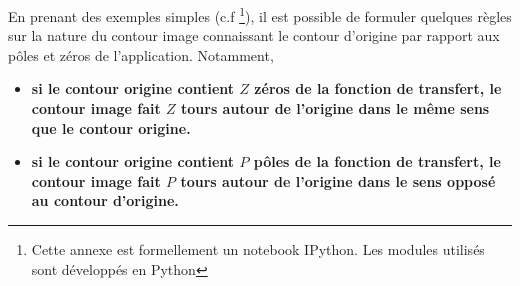 En prenant des exemples simples (c.f \footnote{Cette 
annexe est formellement un notebook IPython. Les modules utilisés sont 
développés en Python}), il est possible de formuler quelques règles sur la 
nature du contour image connaissant le contour d'origine par rapport aux
pôles et zéros de l'application. Notamment,
\begin{itemize}
    \item \textbf{si le contour origine contient $Z$ zéros de la fonction de 
          transfert, le contour image fait $Z$ tours autour de l'origine dans 
          le même sens que le contour origine.}
    \item \textbf{si le contour origine contient $P$ pôles de la fonction de 
          transfert, le contour image fait $P$ tours autour de l'origine dans 
          le sens opposé au contour d'origine.}
\end{itemize}
\clearpage

\captionsetup{width=0.9\linewidth}
